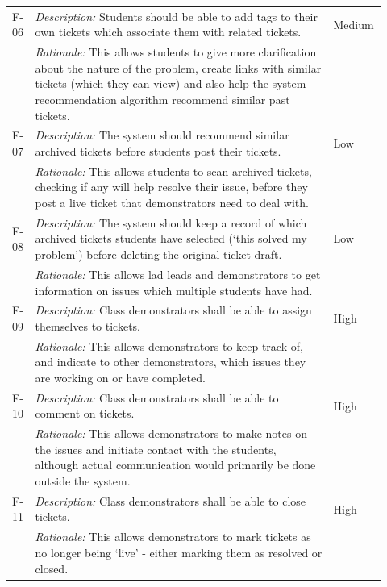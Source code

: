 \documentclass[a4paper,11pt]{article}
\begin{document}
\begin{table}[H]
\begin{tabular}{|p{0.05\linewidth} | p{0.78\linewidth} |p{0.09\linewidth}|}
  
 \hline\hline
 F-06 & \textit{Description:} Students should be able to add tags to their own tickets which associate them with related tickets. & Medium\\
  \cline{2-2}
  & \textit{Rationale:} This allows students to give more clarification about the nature of the problem, create links with similar tickets (which they can view) and also help the system recommendation algorithm recommend similar past tickets. & \\

  
    \hline\hline
 F-07 & \textit{Description:} The system should recommend similar archived tickets before students post their tickets. & Low\\
  \cline{2-2}
  & \textit{Rationale:} This allows students to scan archived tickets, checking if any will help resolve their issue, before they post a live ticket that demonstrators need to deal with. & \\
  
      \hline\hline
 F-08 & \textit{Description:} The system should keep a record of which archived tickets students have selected (`this solved my problem') before deleting the original ticket draft. & Low\\
  \cline{2-2}
  & \textit{Rationale:} This allows lad leads and demonstrators to get information on issues which multiple students have had. & \\
  
   \hline\hline
 F-09 & \textit{Description:} Class demonstrators shall be able to assign themselves to tickets. & High\\
  \cline{2-2}
  & \textit{Rationale:} This allows demonstrators to keep track of, and indicate to other demonstrators, which issues they are working on or have completed. & \\

  
  \hline\hline
 F-10 & \textit{Description:} Class demonstrators shall be able to comment on tickets. & High\\
  \cline{2-2}
  & \textit{Rationale:} This allows demonstrators to make notes on the issues and initiate contact with the students, although actual communication would primarily be done outside the system. & \\

    \hline\hline
 F-11 & \textit{Description:} Class demonstrators shall be able to close tickets. & High\\
  \cline{2-2}
  & \textit{Rationale:} This allows demonstrators to mark tickets as no longer being `live' - either marking them as resolved or closed. & \\


\end{tabular}
\end{table}
\end{document}
